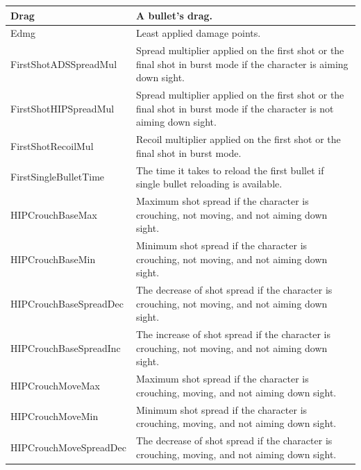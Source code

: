 \documentclass[MGS,Master,english]{twbook}%
\begin{document}
\begin{longtable}[c]{|l|p{10.5cm}|}
	Drag                   & A bullet's drag.                                                                                                               \\ \hline
	Edmg                   & Least applied damage points.                                                                                                   \\ \hline
	FirstShotADSSpreadMul  & Spread multiplier applied on the first shot or the final shot in burst mode if the character is aiming down sight.             \\ \hline
	FirstShotHIPSpreadMul  & Spread multiplier applied on the first shot or the final shot in burst mode if the character is not aiming down sight.         \\ \hline
	FirstShotRecoilMul     & Recoil multiplier applied on the first shot or the final shot in burst mode.                                                   \\ \hline
	FirstSingleBulletTime  & The time it takes to reload the first bullet if single bullet reloading is available.                                          \\ \hline
	HIPCrouchBaseMax       & Maximum shot spread if the character is crouching, not moving, and not aiming down sight.                                      \\ \hline
	HIPCrouchBaseMin       & Minimum shot spread if the character is crouching, not moving, and not aiming down sight.                                      \\ \hline
	HIPCrouchBaseSpreadDec & The decrease of shot spread if the character is crouching, not moving, and not aiming down sight.                              \\ \hline
	HIPCrouchBaseSpreadInc & The increase of shot spread if the character is crouching, not moving, and not aiming down sight.                              \\ \hline
	HIPCrouchMoveMax       & Maximum shot spread if the character is crouching, moving, and not aiming down sight.                                          \\ \hline
	HIPCrouchMoveMin       & Minimum shot spread if the character is crouching, moving, and not aiming down sight.                                          \\ \hline
	HIPCrouchMoveSpreadDec & The decrease of shot spread if the character is crouching, moving, and not aiming down sight.                                  \\ \hline

\end{longtable}
\end{document}
